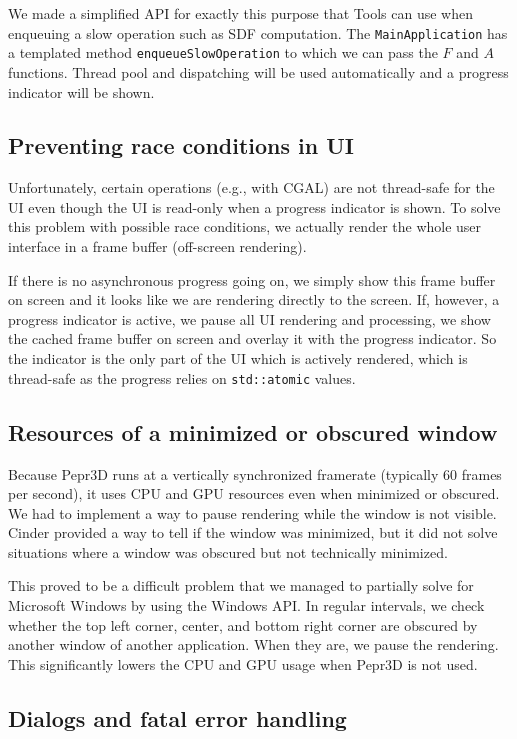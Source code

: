 We made a simplified API for exactly this purpose that Tools can use when enqueuing a slow operation such as SDF computation.
The \texttt{MainApplication} has a templated method \texttt{enqueueSlowOperation} to which we can pass the $F$ and $A$ functions.
Thread pool and dispatching will be used automatically and a progress indicator will be shown.

\subsection{Preventing race conditions in UI}

Unfortunately, certain operations (e.g., with CGAL) are not thread-safe for the UI even though the UI is read-only when a progress indicator is shown.
To solve this problem with possible race conditions, we actually render the whole user interface in a frame buffer (off-screen rendering).

If there is no asynchronous progress going on, we simply show this frame buffer on screen and it looks like we are rendering directly to the screen.
If, however, a progress indicator is active, we pause all UI rendering and processing, we show the cached frame buffer on screen and overlay it with the progress indicator.
So the indicator is the only part of the UI which is actively rendered, which is thread-safe as the progress relies on \texttt{std::atomic} values.

\subsection{Resources of a minimized or obscured window}

Because Pepr3D runs at a vertically synchronized framerate (typically 60 frames per second), it uses CPU and GPU resources even when minimized or obscured.
We had to implement a way to pause rendering while the window is not visible.
Cinder provided a way to tell if the window was minimized, but it did not solve situations where a window was obscured but not technically minimized.

This proved to be a difficult problem that we managed to partially solve for Microsoft Windows by using the Windows API.
In regular intervals, we check whether the top left corner, center, and bottom right corner are obscured by another window of another application.
When they are, we pause the rendering.
This significantly lowers the CPU and GPU usage when Pepr3D is not used.

\subsection{Dialogs and fatal error handling}


